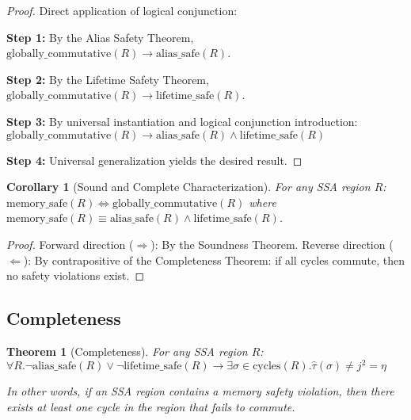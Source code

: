 \documentclass[acmsmall,anonymous,review,screen]{acmart}
\newtheorem{theorem}{Theorem}
\newtheorem{corollary}{Corollary}
\begin{document}
	\begin{proof}
		Direct application of logical conjunction:
		
		\textbf{Step 1:} By the Alias Safety Theorem, $\text{globally\_commutative}(R) \to \text{alias\_safe}(R)$.
		
		\textbf{Step 2:} By the Lifetime Safety Theorem, $\text{globally\_commutative}(R) \to \text{lifetime\_safe}(R)$.
		
		\textbf{Step 3:} By universal instantiation and logical conjunction introduction: $\text{globally\_commutative}(R) \to \text{alias\_safe}(R) \land \text{lifetime\_safe}(R)$
		
		\textbf{Step 4:} Universal generalization yields the desired result.
	\end{proof}
	
	\begin{corollary}[Sound and Complete Characterization]
		For any SSA region $R$: $\text{memory\_safe}(R) \iff \text{globally\_commutative}(R)$ where $\text{memory\_safe}(R) \equiv \text{alias\_safe}(R) \land \text{lifetime\_safe}(R)$.
	\end{corollary}
	
	\begin{proof}
		Forward direction ($\Rightarrow$): By the Soundness Theorem. Reverse direction ($\Leftarrow$): By contrapositive of the Completeness Theorem: if all cycles commute, then no safety violations exist.
	\end{proof}
	
	\subsection{Completeness}
	
	\begin{theorem}[Completeness]
		For any SSA region $R$: $\forall R.\neg\text{alias\_safe}(R) \lor \neg\text{lifetime\_safe}(R) \to \exists\sigma \in \text{cycles}(R).\hat{\tau}(\sigma) \neq j^{2} = \eta$
		
		In other words, if an SSA region contains a memory safety violation, then there exists at least one cycle in the region that fails to commute.
	\end{theorem}
	
\end{document}
